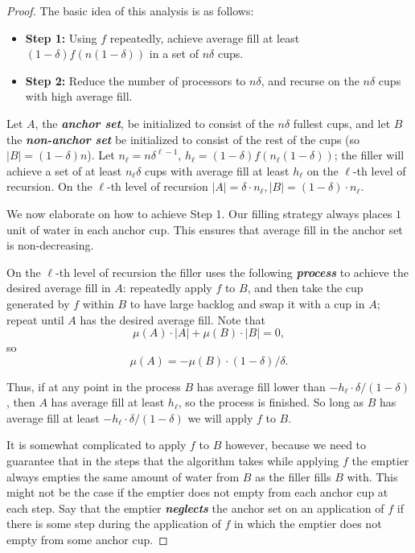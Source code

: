 \documentclass[twocolumn]{article}[10pt]
\newcommand{\defn}[1]{{\textit{\textbf{\boldmath #1}}}\xspace}
\begin{document}
\begin{proof}
  The basic idea of this analysis is as follows:
  \begin{itemize}
    \item \textbf{Step 1:} Using $f$ repeatedly, achieve average fill at least $(1-\delta)
      f(n(1-\delta))$ in a set of $n\delta$ cups. 
    \item \textbf{Step 2:} Reduce the number of processors to $n\delta$, and
      recurse on the $n\delta$ cups with high average fill.
  \end{itemize}

  Let $A$, the \defn{anchor set}, be initialized to consist of the $n\delta$
  fullest cups, and let $B$ the \defn{non-anchor set} be initialized to consist
  of the rest of the cups (so $|B| = (1-\delta)n$).
  Let $n_\ell = n\delta^{\ell-1}$, $h_\ell = (1-\delta)f(n_\ell(1-\delta))$;
  the filler will achieve a set of at least $n_\ell \delta$ cups with average
  fill at least $h_\ell$ on the $\ell$-th
  level of recursion. On the $\ell$-th level of recursion $|A| = \delta\cdot
  n_\ell, |B| = (1-\delta)\cdot n_\ell$.

  We now elaborate on how to achieve Step 1.
  Our filling strategy always places $1$ unit of water in each anchor cup. This
  ensures that average fill in the anchor set is non-decreasing.

  On the $\ell$-th level of recursion the filler uses the following
  \defn{process} to achieve the desired average fill in $A$: repeatedly apply
  $f$ to $B$, and then take the cup generated by $f$ within $B$ to have large
  backlog and swap it with a cup in $A$; repeat until $A$ has the desired
  average fill. Note that $$\mu(A) \cdot |A| +\mu(B)\cdot |B| = 0,$$ so
  $$\mu(A) = - \mu(B) \cdot (1-\delta)/ \delta.$$

  Thus, if at any point in the process $B$ has average fill lower than $-h_\ell
  \cdot \delta/(1-\delta)$, then $A$ has average fill at least $h_\ell$, so the
  process is finished. So long as $B$ has average fill at least $-h_\ell\cdot
  \delta/(1-\delta)$ we will apply $f$ to $B$.
  
  It is somewhat complicated to apply $f$ to $B$ however, because we need to
  guarantee that in the steps that the algorithm takes while applying $f$ the
  emptier always empties the same amount of water from $B$ as the filler fills
  $B$ with. This might not be the case if the emptier does not empty from each
  anchor cup at each step. Say that the emptier \defn{neglects} the anchor set
  on an application of $f$ if there is some step during the application of $f$
  in which the emptier does not empty from some anchor cup.


\end{proof}
\end{document}
